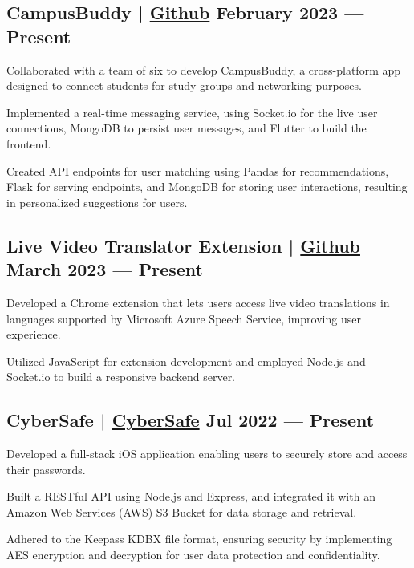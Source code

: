 \subsection{{CampusBuddy | \href{https://github.com/pegliang/CampusBuddy}{Github} \hfill February 2023 --- Present}}
\begin{zitemize}
\item Collaborated with a team of six to develop CampusBuddy, a cross-platform app designed to connect students for study groups and networking purposes.
\item Implemented a real-time messaging service, using Socket.io for the live user connections, MongoDB to persist user messages, and Flutter to build the frontend.
\item Created API endpoints for user matching using Pandas for recommendations, Flask for serving endpoints, and MongoDB for storing user interactions, resulting in personalized suggestions for users.
\end{zitemize}

\subsection{{Live Video Translator Extension | \href{https://github.com/jerikjakobsen/Translator-Extension}{Github} \hfill March 2023 --- Present}}
\begin{zitemize}
\item Developed a Chrome extension that lets users access live video translations in languages supported by Microsoft Azure Speech Service, improving user experience.
\item Utilized JavaScript for extension development and employed Node.js and Socket.io to build a responsive backend server.
\end{zitemize}

\subsection{{CyberSafe | \href{https://github.com/jerikjakobsen/CyberSafe}{CyberSafe} \hfill Jul 2022 --- Present}}
\begin{zitemize}
\item Developed a full-stack iOS application enabling users to securely store and access their passwords.
\item Built a RESTful API using Node.js and Express, and integrated it with an Amazon Web Services (AWS) S3 Bucket for data storage and retrieval.
\item Adhered to the Keepass KDBX file format, ensuring security by implementing AES encryption and decryption for user data protection and confidentiality.
\end{zitemize}
